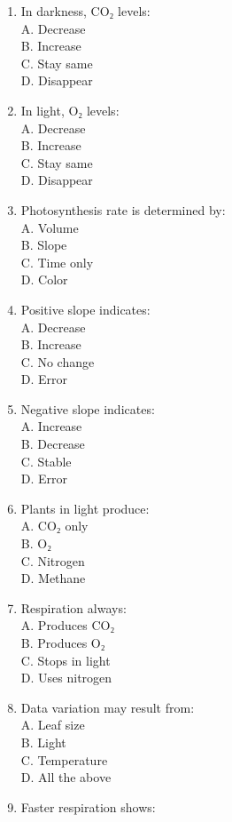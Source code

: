 \documentclass[
  letterpaper,
  DIV=11,
  numbers=noendperiod]{scrreprt}
\begin{document}
\begin{enumerate}
\def\labelenumi{\arabic{enumi}.}
\item
  In darkness, CO₂ levels:\\
  A. Decrease\\
  B. Increase\\
  C. Stay same\\
  D. Disappear
\item
  In light, O₂ levels:\\
  A. Decrease\\
  B. Increase\\
  C. Stay same\\
  D. Disappear
\item
  Photosynthesis rate is determined by:\\
  A. Volume\\
  B. Slope\\
  C. Time only\\
  D. Color
\item
  Positive slope indicates:\\
  A. Decrease\\
  B. Increase\\
  C. No change\\
  D. Error
\item
  Negative slope indicates:\\
  A. Increase\\
  B. Decrease\\
  C. Stable\\
  D. Error
\item
  Plants in light produce:\\
  A. CO₂ only\\
  B. O₂\\
  C. Nitrogen\\
  D. Methane
\item
  Respiration always:\\
  A. Produces CO₂\\
  B. Produces O₂\\
  C. Stops in light\\
  D. Uses nitrogen
\item
  Data variation may result from:\\
  A. Leaf size\\
  B. Light\\
  C. Temperature\\
  D. All the above
\item
  Faster respiration shows:\\

\end{enumerate}
\end{document}
